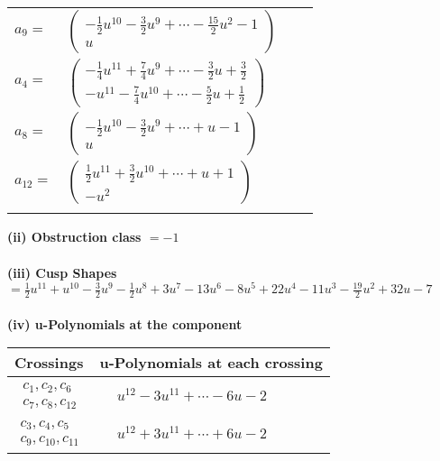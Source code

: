 \documentclass[1p]{elsarticle_modified}
\theoremstyle{definition}
\begin{document}
\begin{tabular}{m{7pt} m{180pt} m{7pt} m{180pt} }
\flushright $a_{9}=$&$\begin{pmatrix}-\frac{1}{2} u^{10}-\frac{3}{2} u^9+\cdots-\frac{15}{2} u^2-1\\u\end{pmatrix}$ \\
\flushright $a_{4}=$&$\begin{pmatrix}-\frac{1}{4} u^{11}+\frac{7}{4} u^9+\cdots-\frac{3}{2} u+\frac{3}{2}\\- u^{11}-\frac{7}{4} u^{10}+\cdots-\frac{5}{2} u+\frac{1}{2}\end{pmatrix}$ \\
\flushright $a_{8}=$&$\begin{pmatrix}-\frac{1}{2} u^{10}-\frac{3}{2} u^9+\cdots+u-1\\u\end{pmatrix}$ \\
\flushright $a_{12}=$&$\begin{pmatrix}\frac{1}{2} u^{11}+\frac{3}{2} u^{10}+\cdots+u+1\\- u^2\end{pmatrix}$\\&\end{tabular}
\flushleft \textbf{(ii) Obstruction class $= -1$}\\~\\
\flushleft \textbf{(iii) Cusp Shapes $= \frac{1}{2} u^{11}+u^{10}-\frac{3}{2} u^9-\frac{1}{2} u^8+3 u^7-13 u^6-8 u^5+22 u^4-11 u^3-\frac{19}{2} u^2+32 u-7$}\\~\\
\newpage\renewcommand{\arraystretch}{1}
\flushleft \textbf{(iv) u-Polynomials at the component}\newline \\
\begin{tabular}{m{50pt}|m{274pt}}
Crossings & \hspace{64pt}u-Polynomials at each crossing \\
\hline $$\begin{aligned}c_{1},c_{2},c_{6}\\c_{7},c_{8},c_{12}\end{aligned}$$&$\begin{aligned}
&u^{12}-3 u^{11}+\cdots-6 u-2
\end{aligned}$\\
\hline $$\begin{aligned}c_{3},c_{4},c_{5}\\c_{9},c_{10},c_{11}\end{aligned}$$&$\begin{aligned}
&u^{12}+3 u^{11}+\cdots+6 u-2
\end{aligned}$\\
\hline
\end{tabular}\\~\\
\end{document}
